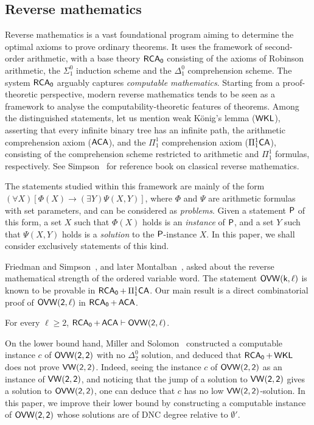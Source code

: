 \subsection{Reverse mathematics}
Reverse mathematics is a vast foundational program aiming to determine the optimal axioms to prove ordinary theorems. It uses the framework of second-order arithmetic, with a base theory $\operatorname{\sf{RCA}_0}$ consisting of the axioms of Robinson arithmetic, the $\Sigma^0_1$ induction scheme and the $\Delta^0_1$ comprehension scheme. The system $\operatorname{\sf{RCA}_0}$ arguably captures \emph{computable mathematics}. Starting from a proof-theoretic perspective, modern reverse mathematics tends to be seen as a framework to analyse the computability-theoretic features of theorems. Among the distinguished statements, let us mention weak K\"onig's lemma ($\operatorname{\sf{WKL}}$), asserting that every infinite binary tree has an infinite path, the arithmetic comprehension axiom ($\operatorname{\sf{ACA}}$), and the $\Pi^1_1$ comprehension axiom ($\operatorname{\Pi^1_1\sf{CA}}$), consisting of the comprehension scheme restricted to arithmetic and $\Pi^1_1$ formulas, respectively. See Simpson~\cite{Simpson2009Subsystems} for reference book on classical reverse mathematics.

The statements studied within this framework are mainly of the form $(\forall X)[\Phi(X) \rightarrow (\exists Y)\Psi(X, Y)]$, where $\Phi$ and $\Psi$ are arithmetic formulas with set parameters, and can be considered as \emph{problems}. Given a statement $\mathsf{P}$ of this form,
	a set $X$ such that $\Phi(X)$ holds is an \emph{instance} of $\mathsf{P}$, and a set $Y$ such that $\Psi(X, Y)$ holds is a \emph{solution} to the $\mathsf{P}$-instance $X$. In this paper, we shall consider exclusively statements of this kind.

Friedman and Simpson~\cite{Friedman2000Issues}, and later Montalban~\cite{Montalban2011Open}, asked about the reverse mathematical strength of the ordered variable word. The statement $\sf{OVW}(k,\ell)$ is known to be provable in $\operatorname{\sf{RCA}_0} + \operatorname{\Pi^1_1\sf{CA}}$. Our main result is a direct combinatorial proof of $\sf{OVW}(2,\ell)$ in $\operatorname{\sf{RCA}_0} + \operatorname{\sf{ACA}}$.

\begin{theorem}\label{thm:aca-ovw2}
	For every $\ell \geq 2$, $\operatorname{\sf{RCA}_0} + \operatorname{\sf{ACA}} \vdash \sf{OVW}(2,\ell)$.
\end{theorem}

On the lower bound hand, Miller and Solomon~\cite{Miller2004Effectiveness} constructed a computable instance $c$ of $\sf{OVW}(2,2)$ with no $\Delta^0_2$ solution, and deduced that $\operatorname{\sf{RCA}_0} + \operatorname{\sf{WKL}}$ does not prove $\sf{VW}(2,2)$. Indeed, seeing the instance $c$ of $\sf{OVW}(2,2)$ as an instance of $\sf{VW}(2,2)$, and noticing that the jump of a solution to $\sf{VW}(2,2)$ gives a solution to $\sf{OVW}(2,2)$, one can deduce that $c$ has no low $\sf{VW}(2,2)$-solution. In this paper, we improve their lower bound by constructing a computable instance of $\sf{OVW}(2,2)$ whose solutions are of DNC degree relative to $\emptyset'$.

